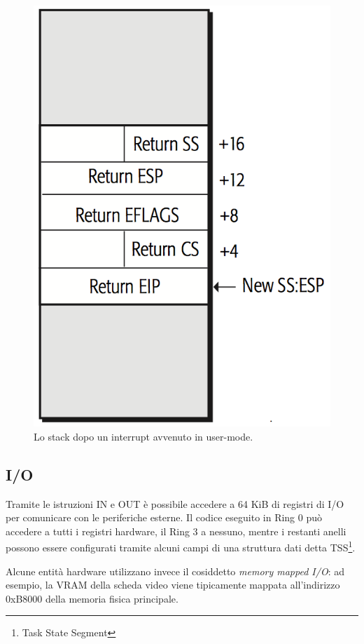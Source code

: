 \documentclass[12pt,a4paper]{report}
\begin{document}
			\begin{figure}[htbp]
			\centering
			\includegraphics[scale=0.7]{img/interrupt.png}
			\caption{Lo stack dopo un interrupt avvenuto in user-mode. \cite{AMD}\label{fig:interrupt}}
			\end{figure}
			
		\subsection{I/O}
			Tramite le istruzioni IN e OUT è possibile accedere a 64 KiB di registri di I/O per comunicare con le periferiche esterne.
			Il codice eseguito in Ring 0 può accedere a tutti i registri hardware, il Ring 3 a nessuno, mentre i restanti anelli possono
			essere configurati tramite alcuni campi di una struttura dati detta TSS\footnote{Task State Segment}.
			
			Alcune entità hardware utilizzano invece il cosiddetto \emph{memory mapped I/O}: ad esempio, la VRAM della scheda
			video viene tipicamente mappata all'indirizzo 0xB8000 della memoria fisica principale.
				
\end{document}
